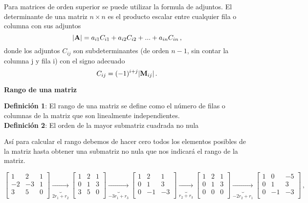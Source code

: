 \documentclass[
]{agujournal2019}
\begin{document}
Para matrices de orden superior se puede utilizar la formula de
adjuntos. El determinante de una matriz \(n\times n\) es el producto
escalar entre cualquier fila o columna con sus adjuntos
\[|{\textbf A}|=a_{i1}C_{i1} + a_{i2}C_{i2}+...+a_{in}C_{in}\,,\] donde
los adjuntos \(C_{ij}\) son subdeterminantes (de orden \(n-1\), sin
contar la columna j y fila i) con el signo adecuado
\[C_{ij}=(-1)^{i+j}|{\textbf M}_{ij}|\,.\]

\vspace{0.5cm}

\textbf{Rango de una matriz} ~

\textbf{Definición 1}: El rango de una matriz se define como el número
de filas o columnas de la matriz que son linealmente independientes.\\

\textbf{Definición 2}: El orden de la mayor submatriz cuadrada no nula

Así para calcular el rango debemos de hacer cero todos los elementos
posibles de la matriz hasta obtener una submatriz no nula que nos
indicará el rango de la matriz.

\[\left[\begin{array}{cccc}
  1 & 2 & 1\\
  -2 & -3 & 1\\
  3 & 5 & 0\\
\end{array}\right]\underbrace{\rightarrow}_{2r_1+r_2}
\left[\begin{array}{cccc}
 1 & 2 & 1\\
  0 & 1 & 3\\
  3 & 5 & 0\\
\end{array}\right]\underbrace{\rightarrow}_{-3r_1+r_3}
\left[\begin{array}{cccc}
 1 & 2 & 1\\
  0 & 1 & 3\\
  0 & -1 & -3\\
\end{array}\right]\underbrace{\rightarrow}_{r_2+r_3}
\left[\begin{array}{cccc}
 1 & 2 & 1\\
  0 & 1 & 3\\
  0 & 0 & 0\\
\end{array}\right]\underbrace{\rightarrow}_{-2r_2+r_1}
\left[\begin{array}{cccc}
 1 & 0 & -5\\
  0 & 1 & 3\\
  0 & -1 & -3\\
\end{array}\right]\,,\]
\end{document}
